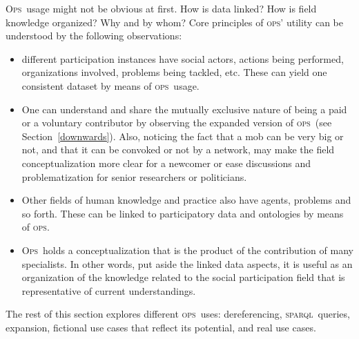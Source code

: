 \documentclass[10pt,letterpaper]{article}
\newcommand{\ops}{\textsc{ops}}
\newcommand{\opsi}{O\textsc{ps}}
\newcommand{\sparql}{\textsc{sparql}}
\begin{document}
\opsi\ usage might not be obvious at first.
How is data linked? How is field knowledge organized? Why and by whom?
Core principles of \ops' utility can be understood by the following observations:
\begin{itemize}
    \item different participation instances have social actors,
    actions being performed, organizations involved, problems being tackled, etc.
    These can yield one consistent dataset by means of \ops\ usage.
    \item One can understand and share the mutually exclusive nature of being
    a paid or a voluntary contributor by observing the expanded version of \ops\ (see Section~\ref{downwards}).
    Also, noticing the fact that a mob can be very big or not,
    and that it can be convoked or not by a network,
    may make the field conceptualization more clear for a newcomer
    or ease discussions and problematization for senior researchers or politicians.
    \item Other fields of human knowledge and practice also have agents, problems and so forth.
    These can be linked to participatory data and ontologies by means of \ops.
    \item \opsi\ holds a conceptualization that is the product of the contribution of many specialists.
    In other words, put aside the linked data aspects,
    it is useful as an organization of the knowledge related to the social participation field that is representative of current understandings.
\end{itemize}

The rest of this section explores different \ops\ uses:
dereferencing, \sparql\ queries, expansion, fictional use cases that reflect its potential,
and real use cases.
\end{document}

